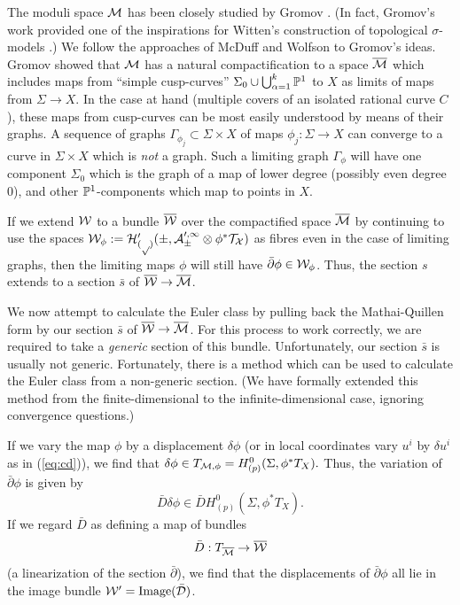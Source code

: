 The moduli space $\mm$ has been closely studied by Gromov \cite{Gro:}.
(In fact,
Gromov's work provided one of the inspirations for Witten's construction
of topological $\sigma$-models \cite{W:tsm}.)
We follow the approaches of McDuff \cite{McD:} and Wolfson \cite{Wol:}
to Gromov's ideas.  Gromov showed that $\mm$
has a natural compactification to a space $\overline{\mm}$ which includes
maps from ``simple cusp-curves'' $\Sigma_0 \cup\bigcup_{\alpha=1}^k \P^1$
to $X$ as limits of maps from $\Sigma\to X$.  In the case at hand (multiple
covers of an isolated rational curve $C$), these maps from
cusp-curves can be most
easily understood by means of their graphs.  A sequence of graphs
$\Gamma_{\phi_j}\subset\Sigma\times X$
of maps $\phi_j:\Sigma\to X$ can converge to a curve in $\Sigma\times X$
which is {\em not} a graph.  Such a limiting graph
$\Gamma_{\phi}$ will have one component $\Sigma_0$
which is the graph of a map of lower degree (possibly even degree 0),
and other $\P^1$-components which map to points in $X$.

If we extend $\W$ to a bundle $\overline{\W}$ over the compactified space
$\overline{\mm}$ by continuing to use the spaces
$\W_\phi:=H^0_{(p)}(\Sigma,\cal A^{0,1}_\Sigma\otimes\phi^*T_X)$
as fibres even in the case of limiting graphs, then the limiting maps
$\phi$ will still have $\bar\partial\phi\in\W_\phi$.  Thus, the section
$s$ extends to a section $\bar s$ of $\overline{\W}\to\overline{\mm}$.

We now attempt to calculate the Euler class by pulling back the
Mathai-Quillen form by our section $\bar s$ of
$\overline{\W}\to\overline{\mm}$.
For this process to work correctly, we are required to take a {\em
generic\/} section of this bundle.
Unfortunately, our section $\bar s$ is usually not generic.  Fortunately,
there is a method \cite{W:matrx} which can be used to calculate the
Euler class from a non-generic section.  (We have formally extended this
method from the finite-dimensional to the infinite-dimensional case,
ignoring convergence questions.)

If we vary the map $\phi$ by a displacement $\delta\phi$ (or in local
coordinates vary $u^i$ by $\delta u^i$ as in (\ref{eq:cd})), we find that
$\delta\phi\in T_{{\mm},\phi}=H^0_{(p)}(\Sigma,\phi^*T_X).$
Thus, the variation of $\bar\partial\phi$ is given by
\begin{equation}
\bar D \delta\phi\in\bar D  H^0_{(p)}(\Sigma,\phi^*T_X).
\end{equation}
If we regard $\bar D $ as defining a map of bundles
\begin{equation}
\bar D :T_{\overline{\mm}}\to\overline{\W}
\end{equation}
(a linearization of the section $\bar\partial$),
we find that the displacements of $\bar\partial\phi$ all lie in the image
bundle $\W^\prime=\Image(\bar D )$.

